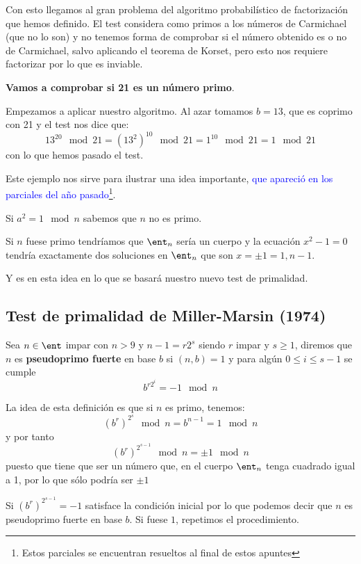 Con esto llegamos al gran problema del algoritmo probabilístico de factorización que hemos definido. El test considera como primos a los números de Carmichael (que no lo son) y no tenemos forma de comprobar si el número obtenido es o no de Carmichael, salvo aplicando el teorema de Korset, pero esto nos requiere factorizar por lo que es inviable.

\begin{example}
\textbf{Vamos a comprobar si 21 es un número primo}.

Empezamos a aplicar nuestro algoritmo. Al azar tomamos $b=13$, que es coprimo con 21 y el test nos dice que:
\[13^{20} \mod 21 = (13^2)^{10} \mod 21 =1^{10} \mod 21 =1 \mod 21\]
con lo que hemos pasado el test.
\end{example}

Este ejemplo nos sirve para ilustrar una idea importante, \textcolor{blue}{que apareció en los parciales del año pasado\footnote{Estos parciales se encuentran resueltos al final de estos apuntes}}.

\begin{mdframed}
Si $a^2 = 1 \mod n$ sabemos que $n$ no es primo.
\end{mdframed}

Si $n$ fuese primo tendríamos que $\ent_{n}$ sería un cuerpo y la ecuación $x^2-1 = 0 $ tendría exactamente dos soluciones en $\ent_{n}$ que son $x=\pm 1 = 1, n-1$.

Y es en esta idea en lo que se basará nuestro nuevo test de primalidad.

\subsection{Test de primalidad de Miller-Marsin (1974)}
\begin{defn}
Sea $n \in \ent$ impar con $n>9$ y $n-1=r2^s$ siendo $r$ impar y $s \geq 1$, diremos que $n$ es \textbf{pseudoprimo fuerte} en base $b$ si $(n,b)=1$ y para algún $0 \leq i \leq s-1$ se cumple
\[b^{r2^i}=-1\mod n\]
\label{defn:MillerMarsinTest}
\end{defn}

La idea de esta definición es que si $n$ es primo, tenemos:
\[(b^r)^{2^s} \mod n=b^{n-1} = 1 \mod n\]
y por tanto
\[(b^r)^{2^{s-1}} \mod n = \pm 1 \mod n\]
puesto que tiene que ser un número que, en el cuerpo $\ent_n$ tenga cuadrado igual a 1, por lo que sólo podría ser $\pm 1$

Si $(b^r)^{2^{s-1}}=-1$ satisface la condición inicial por lo que podemos decir que $n$ es pseudoprimo fuerte en base $b$. Si fuese $1$, repetimos el procedimiento.

